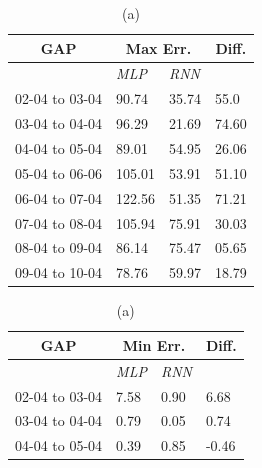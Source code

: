 \begin{table}[H]
	\begin{minipage}[t]{.45\textwidth}
		\centering
		\begin{tabular}[t]{l|l|l|l}
			\multicolumn{1}{c|}{\textbf{GAP}}      &
			\multicolumn{2}{c|}{\textbf{Max Err.}} &
			\multicolumn{1}{c}{\textbf{Diff.}}                                           \\
			\hline
			                                       & \textit{MLP} & \textit{RNN} &       \\
			02-04 to 03-04                         & 90.74        & 35.74        & 55.0  \\
			03-04 to 04-04                         & 96.29        & 21.69        & 74.60 \\
			04-04 to 05-04                         & 89.01        & 54.95        & 26.06 \\
			05-04 to 06-06                         & 105.01       & 53.91        & 51.10 \\
			06-04 to 07-04                         & 122.56       & 51.35        & 71.21 \\
			07-04 to 08-04                         & 105.94       & 75.91        & 30.03 \\
			08-04 to 09-04                         & 86.14        & 75.47        & 05.65 \\
			09-04 to 10-04                         & 78.76        & 59.97        & 18.79
		\end{tabular}
		\caption*{(a)}
	\end{minipage}%
	\hfill
	\begin{minipage}[t]{.45\textwidth}
		\centering
		\begin{tabular}[t]{l|l|l|l}
			\multicolumn{1}{c|}{\textbf{GAP}}      &
			\multicolumn{2}{c|}{\textbf{Min Err.}} &
			\multicolumn{1}{c}{\textbf{Diff.}}                                           \\
			\hline
			                                       & \textit{MLP} & \textit{RNN} &       \\
			02-04 to 03-04                         & 7.58         & 0.90         & 6.68  \\
			03-04 to 04-04                         & 0.79         & 0.05         & 0.74  \\
			04-04 to 05-04                         & 0.39         & 0.85         & -0.46 \\

\end{tabular}
\end{minipage}
\end{table}
